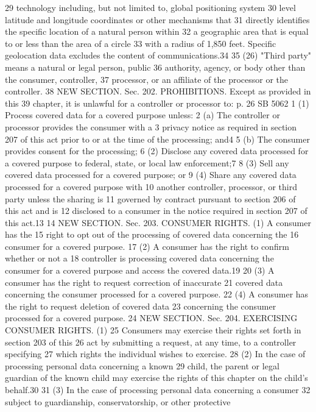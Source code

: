 29 technology including, but not limited to, global positioning system
30 level latitude and longitude coordinates or other mechanisms that
31 directly identifies the specific location of a natural person within
32 a geographic area that is equal to or less than the area of a circle
33 with a radius of 1,850 feet. Specific geolocation data excludes the
content of communications.34
35 (26) "Third party" means a natural or legal person, public
36 authority, agency, or body other than the consumer, controller,
37 processor, or an affiliate of the processor or the controller.
38 NEW SECTION. Sec. 202. PROHIBITIONS. Except as provided in this
39 chapter, it is unlawful for a controller or processor to:
p. 26 SB 5062
1 (1) Process covered data for a covered purpose unless:
2 (a) The controller or processor provides the consumer with a
3 privacy notice as required in section 207 of this act prior to or at
the time of the processing; and4
5 (b) The consumer provides consent for the processing;
6 (2) Disclose any covered data processed for a covered purpose to
federal, state, or local law enforcement;7
8 (3) Sell any covered data processed for a covered purpose; or
9 (4) Share any covered data processed for a covered purpose with
10 another controller, processor, or third party unless the sharing is
11 governed by contract pursuant to section 206 of this act and is
12 disclosed to a consumer in the notice required in section 207 of this
act.13
14 NEW SECTION. Sec. 203. CONSUMER RIGHTS. (1) A consumer has the
15 right to opt out of the processing of covered data concerning the
16 consumer for a covered purpose.
17 (2) A consumer has the right to confirm whether or not a
18 controller is processing covered data concerning the consumer for a
covered purpose and access the covered data.19
20 (3) A consumer has the right to request correction of inaccurate
21 covered data concerning the consumer processed for a covered purpose.
22 (4) A consumer has the right to request deletion of covered data
23 concerning the consumer processed for a covered purpose.
24 NEW SECTION. Sec. 204. EXERCISING CONSUMER RIGHTS. (1)
25 Consumers may exercise their rights set forth in section 203 of this
26 act by submitting a request, at any time, to a controller specifying
27 which rights the individual wishes to exercise.
28 (2) In the case of processing personal data concerning a known
29 child, the parent or legal guardian of the known child may exercise
the rights of this chapter on the child's behalf.30
31 (3) In the case of processing personal data concerning a consumer
32 subject to guardianship, conservatorship, or other protective
